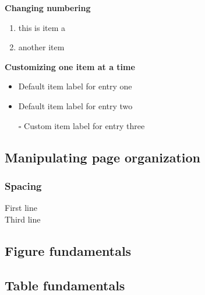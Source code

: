 \documentclass[./main.tex]{subfiles}
\begin{document}
\noindent \textbf{Changing numbering}
\begin{enumerate}
\item this is item a
\setcounter{enumi}{5}
\item another item
\end{enumerate}

\noindent \textbf{Customizing one item at a time}
\begin{itemize}
\item  Default item label for entry one
\item  Default item label for entry two
\item[$\square$]  Custom item label for entry three
\end{itemize}

\subsection*{Manipulating page organization}
\subsubsection*{Spacing}
First line\\ \vspace{\baselineskip}
Third line

\subsection*{Figure fundamentals}

\subsection*{Table fundamentals}
\end{document}

